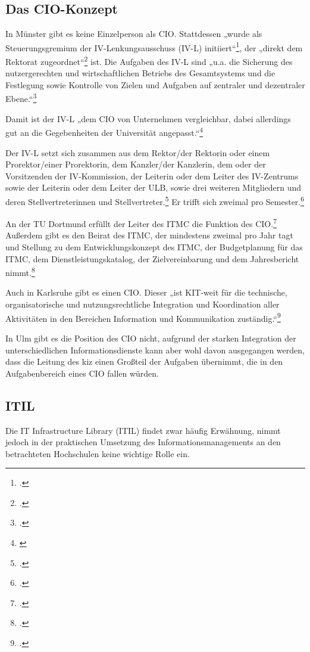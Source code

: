 \subsection{Das CIO-Konzept}
\label{subsection_cio_konzept}
In Münster gibt es keine Einzelperson als CIO. Stattdessen „wurde als Steuerungsgremium der IV-Lenkungsausschuss (IV-L) initiiert“\footcite[59]{bode_informationsmanagement_2010}, der „direkt dem Rektorat zugeordnet“\footcite[59]{bode_informationsmanagement_2010} ist. Die Aufgaben des IV-L sind „u.a. die Sicherung des nutzergerechten und wirtschaftlichen Betriebs des Gesamtsystems und die Festlegung sowie Kontrolle von Zielen und Aufgaben auf zentraler und dezentraler Ebene.“\footcite[9]{vogl_bericht_2013}

Damit ist der IV-L „dem CIO von Unternehmen vergleichbar, dabei allerdings gut an die Gegebenheiten der Universität angepasst.“\footnote{\cite[60]{bode_informationsmanagement_2010}}

Der IV-L setzt sich zusammen aus dem Rektor/der Rektorin oder einem Prorektor/einer Prorektorin, dem Kanzler/der Kanzlerin, dem oder der Vorsitzenden der IV-Kommission, der Leiterin oder dem Leiter des IV-Zentrums sowie der Leiterin oder dem Leiter der ULB, sowie drei weiteren Mitgliedern und deren Stellvertreterinnen und Stellvertreter.\footcite{wwu_ivlenkungsausschuss_2015}
Er trifft sich zweimal pro Semester.\footcite{wwu_ivlenkungsausschuss_2015}

An der TU Dortmund erfüllt der Leiter des ITMC die Funktion des CIO.\footcite[37]{tudortmund_jahrbuch_2009}
Außerdem gibt es den Beirat des ITMC, der mindestens zweimal pro Jahr tagt und Stellung zu dem Entwicklungskonzept des ITMC, der Budgetplanung für das ITMC, dem Dienstleistungskatalog, der Zielvereinbarung und dem Jahresbericht nimmt.\footcite{tudortmund_itmc_beirat_2013}

Auch in Karlsruhe gibt es einen CIO. Dieser „ist KIT-weit für die technische, organisatorische und nutzungsrechtliche Integration und Koordination aller Aktivitäten in den Bereichen Information und Kommunikation zuständig.“\footcite{kit_cio_2015}

In Ulm gibt  es die Position des CIO nicht, aufgrund der starken Integration der unterschiedlichen Informationsdienste kann aber wohl davon ausgegangen werden, dass die Leitung des kiz einen Großteil der Aufgaben übernimmt, die in den Aufgabenbereich eines CIO fallen würden.

\subsection{ITIL}
\label{subsection_itil_best_practice}
Die IT Infrastructure Library (ITIL) findet zwar häufig Erwähnung, nimmt jedoch in der praktischen Umsetzung des Informationsmanagements an den betrachteten Hochschulen keine wichtige Rolle ein.


